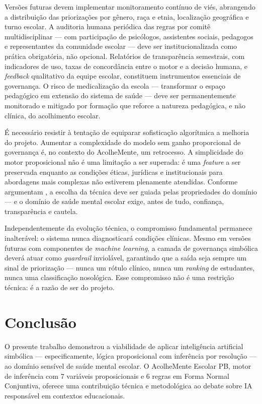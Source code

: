 \documentclass[
    12pt,
    openright,
    oneside,
    a4paper,
    english,
    brazil
]{abntex2}
\begin{document}
Versões futuras devem implementar monitoramento contínuo de viés, abrangendo a distribuição das priorizações por gênero, raça e etnia, localização geográfica e turno escolar. A auditoria humana periódica das regras por comitê multidisciplinar --- com participação de psicólogos, assistentes sociais, pedagogos e representantes da comunidade escolar --- deve ser institucionalizada como prática obrigatória, não opcional. Relatórios de transparência semestrais, com indicadores de uso, taxas de concordância entre o motor e a decisão humana, e \textit{feedback} qualitativo da equipe escolar, constituem instrumentos essenciais de governança. O risco de medicalização da escola --- transformar o espaço pedagógico em extensão do sistema de saúde --- deve ser permanentemente monitorado e mitigado por formação que reforce a natureza pedagógica, e não clínica, do acolhimento escolar.

É necessário resistir à tentação de equiparar sofisticação algorítmica a melhoria do projeto. Aumentar a complexidade do modelo sem ganho proporcional de governança é, no contexto do AcolheMente, um retrocesso. A simplicidade do motor proposicional não é uma limitação a ser superada: é uma \textit{feature} a ser preservada enquanto as condições éticas, jurídicas e institucionais para abordagens mais complexas não estiverem plenamente atendidas. Conforme argumentam , a escolha da técnica deve ser guiada pelas propriedades do domínio --- e o domínio de saúde mental escolar exige, antes de tudo, confiança, transparência e cautela.

Independentemente da evolução técnica, o compromisso fundamental permanece inalterável: o sistema nunca diagnosticará condições clínicas. Mesmo em versões futuras com componentes de \textit{machine learning}, a camada de governança simbólica deverá atuar como \textit{guardrail} inviolável, garantindo que a saída seja sempre um sinal de priorização --- nunca um rótulo clínico, nunca um \textit{ranking} de estudantes, nunca uma classificação nosológica. Esse compromisso não é uma restrição técnica: é a razão de ser do projeto.

\chapter{Conclusão}

O presente trabalho demonstrou a viabilidade de aplicar inteligência artificial simbólica --- especificamente, lógica proposicional com inferência por resolução --- ao domínio sensível de saúde mental escolar. O AcolheMente Escolar PB, motor de inferência com 7 variáveis proposicionais e 6 regras em Forma Normal Conjuntiva, oferece uma contribuição técnica e metodológica ao debate sobre IA responsável em contextos educacionais.
\end{document}
